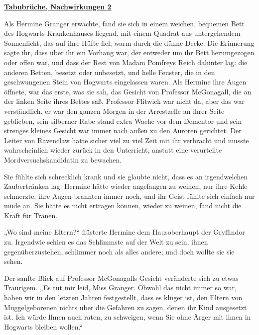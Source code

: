 

\hypertarget{tabubruxfcche-nachwirkungen-2}{%

\textbf{\uline{Tabubrüche, Nachwirkungen 2}}

\hfill\break Als Hermine Granger erwachte, fand sie sich in einem weichen, bequemen Bett des Hogwarts-Krankenhauses liegend, mit einem Quadrat aus untergehendem Sonnenlicht, das auf ihre Hüfte fiel, warm durch die dünne Decke. Die Erinnerung sagte ihr, dass über ihr ein Vorhang war, der entweder um ihr Bett herumgezogen oder offen war, und dass der Rest von Madam Pomfreys Reich dahinter lag: die anderen Betten, besetzt oder unbesetzt, und helle Fenster, die in den geschwungenen Stein von Hogwarts eingelassen waren. Als Hermine ihre Augen öffnete, war das erste, was sie sah, das Gesicht von Professor McGonagall, die an der linken Seite ihres Bettes saß. Professor Flitwick war nicht da, aber das war verständlich, er war den ganzen Morgen in der Arrestzelle an ihrer Seite geblieben, sein silberner Rabe stand extra Wache vor dem Dementor und sein strenges kleines Gesicht war immer nach außen zu den Auroren gerichtet. Der Leiter von Ravenclaw hatte sicher viel zu viel Zeit mit ihr verbracht und musste wahrscheinlich wieder zurück in den Unterricht, anstatt eine verurteilte Mordversuchskandidatin zu bewachen.

Sie fühlte sich schrecklich krank und sie glaubte nicht, dass es an irgendwelchen Zaubertränken lag. Hermine hätte wieder angefangen zu weinen, nur ihre Kehle schmerzte, ihre Augen brannten immer noch, und ihr Geist fühlte sich einfach nur müde an. Sie hätte es nicht ertragen können, wieder zu weinen, fand nicht die Kraft für Tränen.

„Wo sind meine Eltern?“ flüsterte Hermine dem Hausoberhaupt der Gryffindor zu. Irgendwie schien es das Schlimmste auf der Welt zu sein, ihnen gegenüberzustehen, schlimmer noch als alles andere; und doch wollte sie sie sehen.

Der sanfte Blick auf Professor McGonagalls Gesicht veränderte sich zu etwas Traurigem. „Es tut mir leid, Miss Granger. Obwohl das nicht immer so war, haben wir in den letzten Jahren festgestellt, dass es klüger ist, den Eltern von Muggelgeborenen nichts über die Gefahren zu sagen, denen ihr Kind ausgesetzt ist. Ich würde Ihnen auch raten, zu schweigen, wenn Sie ohne Ärger mit ihnen in Hogwarts bleiben wollen.“

}
